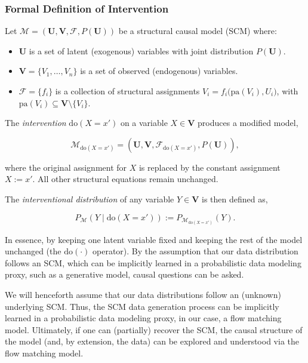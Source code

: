 \subsubsection{Formal Definition of Intervention}
\label{subsubsec:intervention}

Let $\mathcal{M} = (\mathbf{U}, \mathbf{V}, \mathcal{F}, P(\mathbf{U}))$ be a structural causal model (SCM) where:

\begin{itemize}
    \itemsep0em
    \item $\mathbf{U}$ is a set of latent (exogenous) variables with joint distribution $P(\mathbf{U})$.
    
    \item $\mathbf{V} = \{V_1, \dots, V_n\}$ is a set of observed (endogenous) variables.
    
    \item $\mathcal{F} = \{f_i\}$ is a collection of structural assignments $V_i = f_i\bigl(\mathrm{pa}(V_i), U_i\bigr)$, with $\mathrm{pa}(V_i)\subseteq \mathbf{V}\setminus\{V_i\}$.
\end{itemize}

The \emph{intervention} $\mathrm{do}(X = x')$ on a variable $X \in \mathbf V$ produces a modified model,

$$
\mathcal{M}_{\mathrm{do}(X = x')} = \left(\mathbf{U}, \mathbf{V}, \mathcal{F}_{\mathrm{do}(X = x')}, P(\mathbf{U})\right),
$$

where the original assignment for $X$ is replaced by the constant assignment $X := x'$. All other structural equations remain unchanged.

The \emph{interventional distribution} of any variable $Y\in\mathbf V$ is then defined as,

$$
P_{\mathcal{M}}\left(Y \mid \mathrm{do}(X = x')\right) := P_{\mathcal{M}_{\mathrm{do}(X = x')}}(Y).
$$

In essence, by keeping one latent variable fixed and keeping the rest of the model unchanged (the $\mathrm{do}(\cdot)$ operator). By the assumption that our data distribution follows an SCM, which can be implicitly learned in a probabilistic data modeling proxy, such as a generative model, causal questions can be asked.

We will henceforth assume that our data distributions follow an (unknown) underlying SCM. Thus, the SCM data generation process can be implicitly learned in a probabilistic data modeling proxy, in our case, a flow matching model. Ultimately, if one can (partially) recover the SCM, the causal structure of the model (and, by extension, the data) can be explored and understood via the flow matching model.
